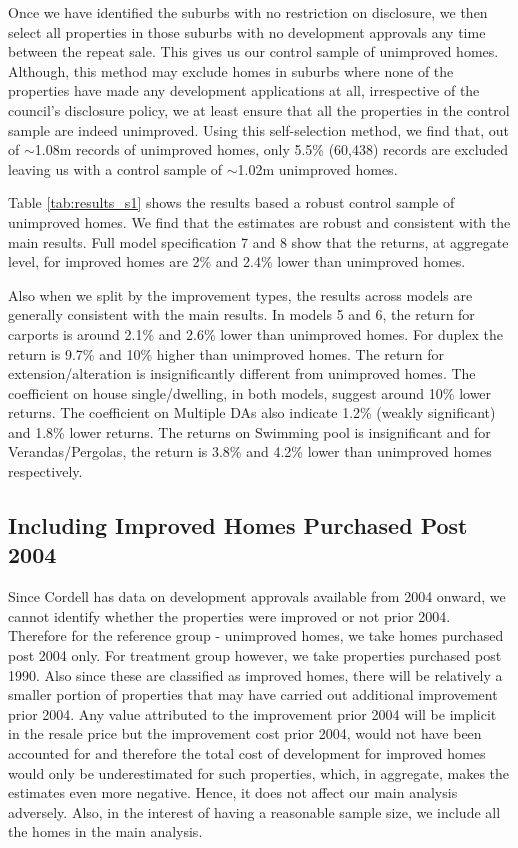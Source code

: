 \documentclass[AEJ,reqno, draftmode]{AEA} %
\begin{document}
Once we have identified the suburbs with no restriction on disclosure, we then select all properties in those suburbs with no development approvals any time between the repeat sale. This gives us our control sample of unimproved homes. Although, this method may exclude homes in suburbs where none of the properties have made any development applications at all, irrespective of the council's disclosure policy, we at least ensure that all the properties in the control sample are indeed unimproved. Using this self-selection method, we find that, out of $\sim$1.08m records of unimproved homes, only 5.5\% (60,438) records are excluded leaving us with a control sample of $\sim$1.02m unimproved homes. 

Table \ref{tab:results_s1} shows the results based a robust control sample of unimproved homes. We find that the estimates are robust and consistent with the main results. Full model specification 7 and 8 show that the returns, at aggregate level, for improved homes are 2\% and 2.4\% lower than unimproved homes. 

Also when we split by the improvement types, the results across models are generally consistent with the main results. In models 5 and 6, the return for carports is around 2.1\% and 2.6\% lower than unimproved homes. For duplex the return is 9.7\% and 10\% higher than unimproved homes. The return for extension/alteration is insignificantly different from unimproved homes. The coefficient on house single/dwelling, in both models, suggest around 10\% lower returns. The coefficient on Multiple DAs also indicate 1.2\% (weakly significant) and 1.8\% lower returns. The returns on Swimming pool is insignificant and for Verandas/Pergolas, the return is 3.8\% and 4.2\% lower than unimproved homes respectively.


\restoregeometry


\subsection{Including Improved Homes Purchased Post 2004}

Since Cordell has data on development approvals available from 2004 onward, we cannot identify whether the properties were improved or not prior 2004. Therefore for the reference group - unimproved homes, we take homes purchased post 2004 only. For treatment group however, we take properties purchased post 1990. Also since these are classified as improved homes, there will be relatively a smaller portion of properties that may have carried out additional improvement prior 2004. Any value attributed to the improvement prior 2004 will be implicit in the resale price but the improvement cost prior 2004, would not have been accounted for and therefore the total cost of development for improved homes would only be underestimated for such properties, which, in aggregate, makes the estimates even more negative. Hence, it does not affect our main analysis adversely. Also, in the interest of having a reasonable sample size, we include all the homes  in the main analysis.
\end{document}

